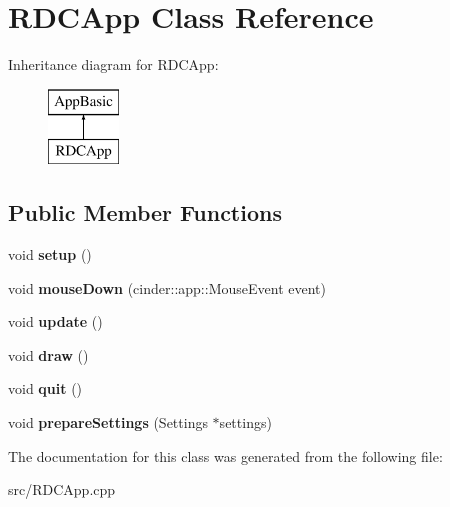 \hypertarget{class_r_d_c_app}{\section{R\-D\-C\-App Class Reference}
\label{class_r_d_c_app}
}
Inheritance diagram for R\-D\-C\-App\-:\begin{figure}[H]
\begin{center}
\leavevmode
\includegraphics[height=2.000000cm]{class_r_d_c_app}
\end{center}
\end{figure}
\subsection*{Public Member Functions}
\begin{DoxyCompactItemize}
\item 
\hypertarget{class_r_d_c_app_a2beba15c6e8e8e6f6201a8a50d8da0f4}{void {\bfseries setup} ()}\label{class_r_d_c_app_a2beba15c6e8e8e6f6201a8a50d8da0f4}

\item 
\hypertarget{class_r_d_c_app_aaaa5b21bfaa4718548670da8ef85874a}{void {\bfseries mouse\-Down} (cinder\-::app\-::\-Mouse\-Event event)}\label{class_r_d_c_app_aaaa5b21bfaa4718548670da8ef85874a}

\item 
\hypertarget{class_r_d_c_app_a723f728fbaa75cf513d4a592ebba124f}{void {\bfseries update} ()}\label{class_r_d_c_app_a723f728fbaa75cf513d4a592ebba124f}

\item 
\hypertarget{class_r_d_c_app_ae9e4cc30d7dd25d5fc65d712e64d722f}{void {\bfseries draw} ()}\label{class_r_d_c_app_ae9e4cc30d7dd25d5fc65d712e64d722f}

\item 
\hypertarget{class_r_d_c_app_ab24352d72c0e773c6edd629584270c8e}{void {\bfseries quit} ()}\label{class_r_d_c_app_ab24352d72c0e773c6edd629584270c8e}

\item 
\hypertarget{class_r_d_c_app_a03237f9900e117ee9cf6fade74b3ada1}{void {\bfseries prepare\-Settings} (Settings $\ast$settings)}\label{class_r_d_c_app_a03237f9900e117ee9cf6fade74b3ada1}

\end{DoxyCompactItemize}


The documentation for this class was generated from the following file\-:\begin{DoxyCompactItemize}
\item 
src/R\-D\-C\-App.\-cpp\end{DoxyCompactItemize}
